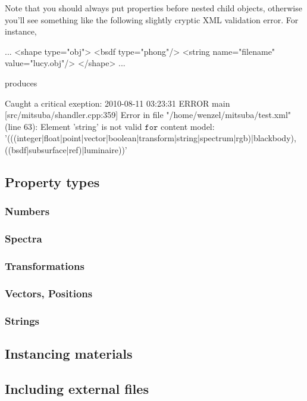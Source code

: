 Note that you should always put properties before nested child objects, otherwise you'll see something like the following slightly cryptic
 XML validation error. For instance,
\begin{xml}
...
	<shape type="obj">
		<bsdf type="phong"/>
		<string name="filename" value="lucy.obj"/>
	</shape>
...
\end{xml}
produces 
\begin{shell}
Caught a critical exeption: 2010-08-11 03:23:31 ERROR main [src/mitsuba/shandler.cpp:359] Error in file "/home/wenzel/mitsuba/test.xml" (line 63): Element 'string' is not valid $\texttt{for}$ content model: '(((integer|float|point|vector|boolean|transform|string|spectrum|rgb)|blackbody),((bsdf|subsurface|ref)|luminaire))'
\end{shell}
\subsection{Property types}
\subsubsection{Numbers}
\subsubsection{Spectra}
\subsubsection{Transformations}
\subsubsection{Vectors, Positions}
\subsubsection{Strings}
\subsection{Instancing materials}
\subsection{Including external files}
